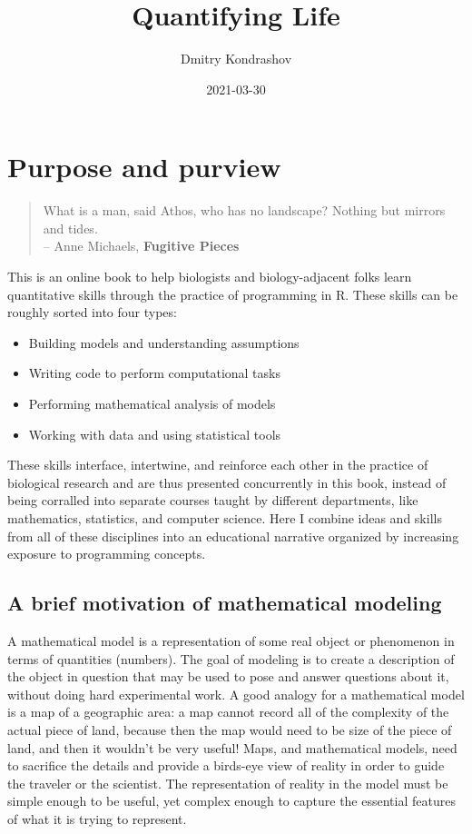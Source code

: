 \documentclass[
]{book}
\title{Quantifying Life}
\author{Dmitry Kondrashov}
\date{2021-03-30}
\theoremstyle{definition}
\theoremstyle{definition}
\theoremstyle{definition}
\theoremstyle{remark}
\begin{document}
\maketitle

{
\setcounter{tocdepth}{1}
\tableofcontents
}
\hypertarget{purpose-and-purview}{%
\chapter*{Purpose and purview}\label{purpose-and-purview}}

\begin{quote}
What is a man, said Athos, who has no landscape? Nothing but mirrors and tides.\\
-- Anne Michaels, \textbf{Fugitive Pieces}
\end{quote}

This is an online book to help biologists and biology-adjacent folks learn quantitative skills through the practice of programming in R. These skills can be roughly sorted into four types:

\begin{itemize}
\item
  Building models and understanding assumptions
\item
  Writing code to perform computational tasks
\item
  Performing mathematical analysis of models
\item
  Working with data and using statistical tools
\end{itemize}

These skills interface, intertwine, and reinforce each other in the practice of biological research and are thus presented concurrently in this book, instead of being corralled into separate courses taught by different departments, like mathematics, statistics, and computer science. Here I combine ideas and skills from all of these disciplines into an educational narrative organized by increasing exposure to programming concepts.

\hypertarget{a-brief-motivation-of-mathematical-modeling}{%
\section{A brief motivation of mathematical modeling}\label{a-brief-motivation-of-mathematical-modeling}}

A mathematical model is a representation of some real object or phenomenon in terms of quantities (numbers). The goal of modeling is to create a description of the object in question that may be used to pose and answer questions about it, without doing hard experimental work. A good analogy for a mathematical model is a map of a geographic area: a map cannot record all of the complexity of the actual piece of land, because then the map would need to be size of the piece of land, and then it wouldn't be very useful! Maps, and mathematical models, need to sacrifice the details and provide a birds-eye view of reality in order to guide the traveler or the scientist. The representation of reality in the model must be simple enough to be useful, yet complex enough to capture the essential features of what it is trying to represent.
\end{document}
